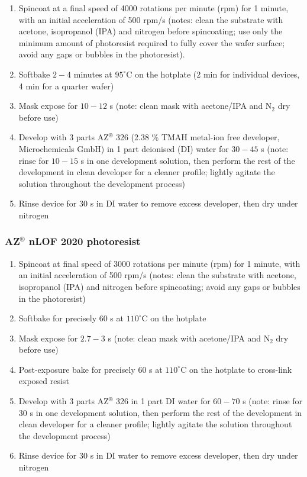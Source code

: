 \documentclass[
  letterpaper,
  DIV=11,
  numbers=noendperiod]{scrartcl}
\begin{document}
\begin{enumerate}
\def\labelenumi{\arabic{enumi}.}
\item
  Spincoat at a final speed of 4000 rotations per minute (rpm) for 1
  minute, with an initial acceleration of 500 rpm/s (notes: clean the
  substrate with acetone, isopropanol (IPA) and nitrogen before
  spincoating; use only the minimum amount of photoresist required to
  fully cover the wafer surface; avoid any gaps or bubbles in the
  photoresist).
\item
  Softbake \(2-4\) minutes at \(95^\circ\)C on the hotplate (2 min for
  individual devices, 4 min for a quarter wafer)
\item
  Mask expose for \(10-12\) s (note: clean mask with acetone/IPA and
  N\(_2\) dry before use)
\item
  Develop with 3 parts AZ\(^\circledR\) 326 (2.38 \% TMAH metal-ion free
  developer, Microchemicals GmbH) in 1 part deionised (DI) water for
  \(30-45\) s (note: rinse for \(10-15\) s in one development solution,
  then perform the rest of the development in clean developer for a
  cleaner profile; lightly agitate the solution throughout the
  development process)
\item
  Rinse device for 30 s in DI water to remove excess developer, then dry
  under nitrogen
\end{enumerate}

\hypertarget{azcircledr-nlof-2020-photoresist}{%
\subsubsection{\texorpdfstring{AZ\(^\circledR\) nLOF 2020
photoresist}{AZ\^{}\textbackslash circledR nLOF 2020 photoresist}}\label{azcircledr-nlof-2020-photoresist}}

\begin{enumerate}
\def\labelenumi{\arabic{enumi}.}
\item
  Spincoat at final speed of 3000 rotations per minute (rpm) for 1
  minute, with an initial acceleration of 500 rpm/s (notes: clean the
  substrate with acetone, isopropanol (IPA) and nitrogen before
  spincoating; avoid any gaps or bubbles in the photoresist)
\item
  Softbake for precisely 60 s at \(110^\circ\)C on the hotplate
\item
  Mask expose for \(2.7-3\) s (note: clean mask with acetone/IPA and
  N\(_2\) dry before use)
\item
  Post-exposure bake for precisely 60 s at \(110^\circ\)C on the
  hotplate to cross-link exposed resist
\item
  Develop with 3 parts AZ\(^\circledR\) 326 in 1 part DI water for
  \(60-70\) s (note: rinse for 30 s in one development solution, then
  perform the rest of the development in clean developer for a cleaner
  profile; lightly agitate the solution throughout the development
  process)
\item
  Rinse device for 30 s in DI water to remove excess developer, then dry
  under nitrogen
\end{enumerate}
\end{document}
